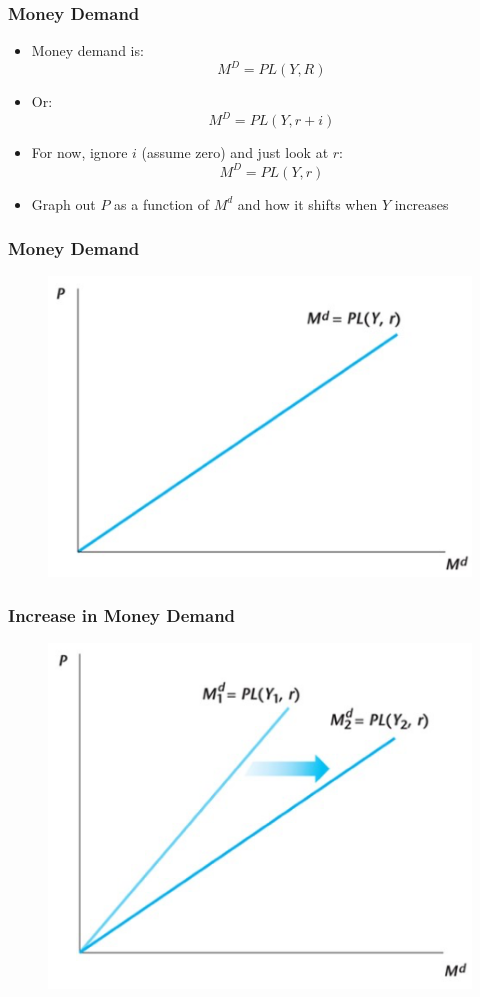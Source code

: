 \documentclass{beamer}
\begin{document}
\begin{frame}
\frametitle[alignment=center]{Money Demand}
\begin{itemize}
\item Money demand is:
$$M^D=PL(Y,R)$$
\bigskip
\item Or:
$$M^D=PL(Y,r+i)$$
\item For now, ignore $i$ (assume zero) and just look at $r$:
$$M^D=PL(Y,r)$$
\item Graph out $P$ as a function of $M^d$ and how it shifts when $Y$ increases
\end{itemize}
\end{frame}

\begin{frame}
\frametitle[alignment=center]{Money Demand}
\begin{figure}
\centering
\includegraphics[scale=0.65]{Figures/W_Fig_12pt6.png}
\end{figure}
\end{frame}

\begin{frame}
\frametitle[alignment=center]{Increase in Money Demand}
\begin{figure}
\centering
\includegraphics[scale=0.65]{Figures/W_Fig_12pt7.png}
\end{figure}
\end{frame}
\end{document}
